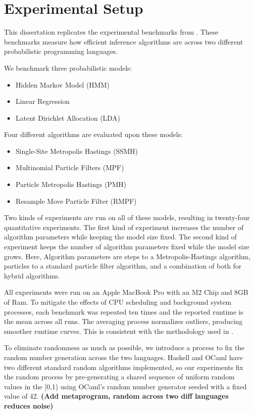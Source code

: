 \documentclass[logo,bsc,singlespacing,parskip,online]{infthesis}
\begin{document}
\section{Experimental Setup}

This dissertation replicates the experimental benchmarks from \cite{ProbFX}. These benchmarks measure how efficient inference algorithms are across two different probabilistic programming languages. 

We benchmark three probabilistic models:

\begin{itemize}
    \item Hidden Markov Model (HMM)
    \item Linear Regression
    \item Latent Dirichlet Allocation (LDA)
  \end{itemize}

Four different algorithms are evaluated upon these models: 

\begin{itemize}
    \item Single-Site Metropolis Hastings (SSMH)
    \item Multinomial Particle Filters (MPF)
    \item Particle Metropolis Hastings (PMH)
    \item Resample Move Particle Filter (RMPF)
  \end{itemize}

Two kinds of experiments are run on all of these models, resulting in twenty-four quantitative experiments. The first kind of experiment increases the number of algorithm parameters while keeping the model size fixed. The second kind of experiment keeps the number of algorithm parameters fixed while the model size grows. Here, Algorithm parameters are steps to a Metropolis-Hastings algorithm, particles to a standard particle filter algorithm, and a combination of both for hybrid algorithms.

All experiments were run on an Apple MacBook Pro with an M2 Chip and 8GB of Ram. To mitigate the effects of CPU scheduling and background system processes, each benchmark was repeated ten times and the reported runtime is the mean across all runs. The averaging process normalizes outliers, producing smoother runtime curves. This is consistent with the methodology used in \cite{ProbFX}.

To eliminate randomness as much as possible, we introduce a process to fix the random number generation across the two languages. Haskell and OCaml have two different standard random algorithms implemented, so our experiments fix the random process by pre-generating a shared sequence of uniform random values in the [0,1) using OCaml's random number generator seeded with a fixed value of 42. \textbf{(Add metaprogram, random across two diff languages reduces noise)}
\end{document}

